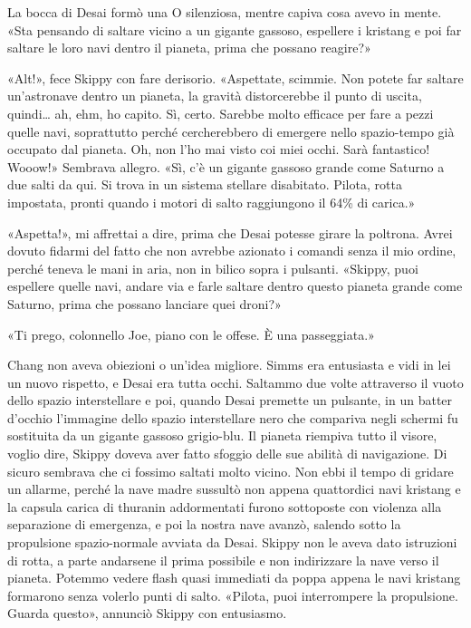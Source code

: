 La bocca di Desai formò una O silenziosa, mentre capiva cosa avevo in
mente. «Sta pensando di saltare vicino a un gigante gassoso, espellere i
kristang e poi far saltare le loro navi dentro il pianeta, prima che
possano reagire?»

«Alt!», fece Skippy con fare derisorio. «Aspettate, scimmie. Non potete
far saltare un'astronave dentro un pianeta, la gravità distorcerebbe il
punto di uscita, quindi\ldots{} ah, ehm, ho capito. Sì, certo. Sarebbe
molto efficace per fare a pezzi quelle navi, soprattutto perché
cercherebbero di emergere nello spazio-tempo già occupato dal pianeta.
Oh, non l'ho mai visto coi miei occhi. Sarà fantastico! Wooow!» Sembrava
allegro. «Sì, c'è un gigante gassoso grande come Saturno a due salti da
qui. Si trova in un sistema stellare disabitato. Pilota, rotta
impostata, pronti quando i motori di salto raggiungono il 64\% di
carica.»

«Aspetta!», mi affrettai a dire, prima che Desai potesse girare la
poltrona. Avrei dovuto fidarmi del fatto che non avrebbe azionato i
comandi senza il mio ordine, perché teneva le mani in aria, non in
bilico sopra i pulsanti. «Skippy, puoi espellere quelle navi, andare via
e farle saltare dentro questo pianeta grande come Saturno, prima che
possano lanciare quei droni?»

«Ti prego, colonnello Joe, piano con le offese. È una passeggiata.»

\hfill\break

Chang non aveva obiezioni o un'idea migliore. Simms era entusiasta e
vidi in lei un nuovo rispetto, e Desai era tutta occhi. Saltammo due
volte attraverso il vuoto dello spazio interstellare e poi, quando Desai
premette un pulsante, in un batter d'occhio l'immagine dello spazio
interstellare nero che compariva negli schermi fu sostituita da un
gigante gassoso grigio-blu. Il pianeta riempiva tutto il visore, voglio
dire, Skippy doveva aver fatto sfoggio delle sue abilità di navigazione.
Di sicuro sembrava che ci fossimo saltati molto vicino. Non ebbi il
tempo di gridare un allarme, perché la nave madre sussultò non appena
quattordici navi kristang e la capsula carica di thuranin addormentati
furono sottoposte con violenza alla separazione di emergenza, e poi la
nostra nave avanzò, salendo sotto la propulsione spazio-normale avviata
da Desai. Skippy non le aveva dato istruzioni di rotta, a parte
andarsene il prima possibile e non indirizzare la nave verso il pianeta.
Potemmo vedere flash quasi immediati da poppa appena le navi kristang
formarono senza volerlo punti di salto. «Pilota, puoi interrompere la
propulsione. Guarda questo», annunciò Skippy con entusiasmo.

